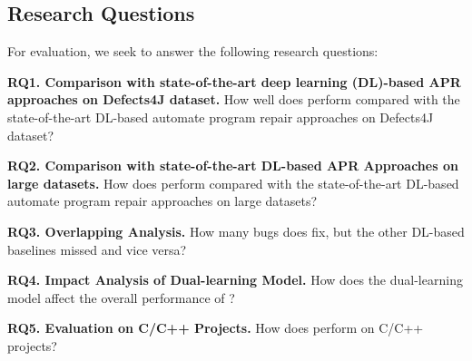 \subsection{Research Questions}

For evaluation, we seek to answer the following research questions:

\noindent\textbf{RQ1. Comparison with state-of-the-art deep learning
  (DL)-based APR approaches on Defects4J dataset.}  How well does
                {\tool} perform compared with the state-of-the-art
               DL-based automate program repair approaches on Defects4J
                dataset?


\noindent\textbf{RQ2. Comparison with state-of-the-art DL-based APR Approaches on large datasets.}  
How does {\tool} perform compared with the state-of-the-art DL-based automate program repair
approaches on large datasets?


\noindent\textbf{RQ3. Overlapping Analysis.} How many bugs does
{\tool} fix, but the other DL-based baselines
                missed and vice versa?

\noindent\textbf{RQ4. Impact Analysis of Dual-learning Model.} How does the dual-learning model affect the overall performance of {\tool}?


\noindent\textbf{RQ5. Evaluation on C/C++ Projects.} How does {\tool} perform on C/C++ projects?
